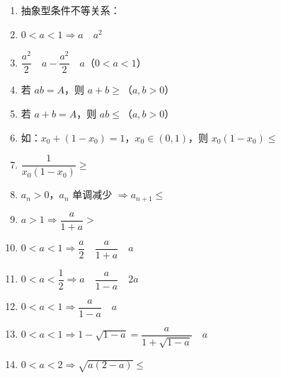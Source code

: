 \documentclass[a4paper,12pt]{article}
\begin{document}
    \begin{minipage}[t]{0.30\textwidth}
        \begin{enumerate}[leftmargin=*, itemsep=1.1em]
            \item 抽象型条件不等关系：
            \item $0<a<1 \Rightarrow a \quad a^2$
            \item $\dfrac{a^2}{2} \quad a - \dfrac{a^2}{2} \quad a$（$0<a<1$）
            \item 若 $ab = A$，则 $a+b \ge$（$a,b>0$）
            \item 若 $a+b = A$，则 $ab \le$（$a,b>0$）
        \end{enumerate}
    \end{minipage}
    \hfill
    \begin{minipage}[t]{0.30\textwidth}
        \begin{enumerate}[leftmargin=*, itemsep=1.1em]
            \setcounter{enumi}{5}
            \item 如：$x_0+(1-x_0)=1$，$x_0\in(0,1)$，则 $x_0(1-x_0) \le$
            \item $\dfrac{1}{x_0(1-x_0)} \ge$
            \item $a_n>0$，$a_n$ 单调减少 $\Rightarrow a_{n+1} \le$
            \item $a>1 \Rightarrow \dfrac{a}{1+a} >$
            \item $0<a<1 \Rightarrow \dfrac{a}{2} \quad \dfrac{a}{1+a} \quad a$
        \end{enumerate}
    \end{minipage}
    \hfill
    \begin{minipage}[t]{0.30\textwidth}
        \begin{enumerate}[leftmargin=*, itemsep=1.1em]
            \setcounter{enumi}{10}
            \item $0<a<\dfrac{1}{2} \Rightarrow a \quad \dfrac{a}{1-a} \quad 2a$
            \item $0<a<1 \Rightarrow \dfrac{a}{1-a} \quad a$
            \item $0<a<1 \Rightarrow 1-\sqrt{1-a} = \dfrac{a}{1+\sqrt{1-a}} \quad a$
            \item $0<a<2 \Rightarrow \sqrt{a(2-a)} \le$
        \end{enumerate}
    \end{minipage}
    \hfill

    \newpage
\end{document}
